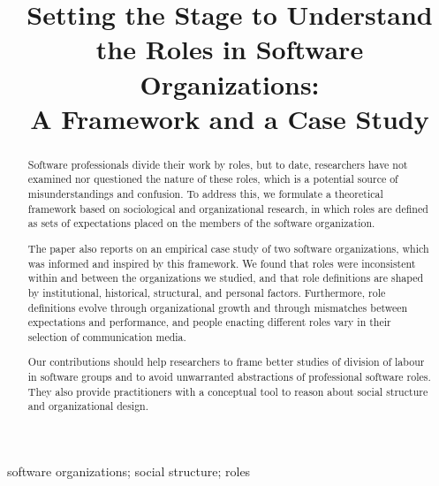 \documentclass[10pt, conference, compsocconf]{IEEEtran}
\begin{document}
\title{Setting the Stage to Understand the Roles in Software Organizations:\\
A Framework and a Case Study}

\author{
}

\maketitle


\begin{abstract}

Software professionals divide their work by roles, but to date, researchers have not examined nor questioned the nature of these roles, which is a potential source of misunderstandings and confusion. To address this, we formulate a theoretical framework based on sociological and organizational research, in which roles are defined as sets of expectations placed on the members of the software organization.

The paper also reports on an empirical case study of two software organizations, which was informed and inspired by this framework. We found that roles were inconsistent within and between the organizations we studied, and that role definitions are shaped by institutional, historical, structural, and personal factors. Furthermore, role definitions evolve through organizational growth and through mismatches between expectations and performance, and people enacting different roles vary in their selection of communication media.

Our contributions should help researchers to frame better studies of division of labour in software groups and to avoid unwarranted abstractions of professional software roles. They also provide practitioners with a conceptual tool to reason about social structure and organizational design.

\end{abstract}

\begin{IEEEkeywords}
software organizations; social structure; roles
\end{IEEEkeywords}

\end{document}
